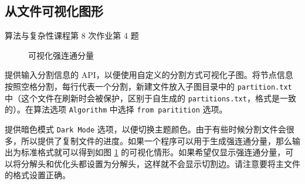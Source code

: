\documentclass[a4paper,12pt]{article}
\begin{document}
\begin{CJK}{UTF8}{song}
\subsection{从文件可视化图形}
\begin{CJK}{UTF8}{kai}
  算法与复杂性课程第 8 次作业第 4 题
\end{CJK}
\begin{figure}[h]
  \centering
  \caption{可视化强连通分量}
  \label{fig:scc}
\end{figure}

提供输入分割信息的 API，以便使用自定义的分割方式可视化子图。将节点信息按照空格分割，每行代表一个分割，新建文件放入子图目录中的 \verb"partition.txt" 中（这个文件在刷新时会被保护，区别于自生成的 \verb"partitions.txt"，格式是一致的）。在算法选项 \verb"Algorithm" 中选择 \verb"from paritition" 选项。

提供暗色模式 \verb"Dark Mode" 选项，以便切换主题颜色。由于有些时候分割文件会很多，所以提供了复制文件的进度。如果一个程序可以用于生成强连通分量，那么输出为标准格式就可以得到如图 \ref{fig:scc} 的可视化情形。如果希望仅显示强连通分量，可以将分解头和优化头都设置为分解头，这样就不会显示切割边。请注意要将主文件的格式设置正确。

\newpage



\end{CJK}
\end{document}
